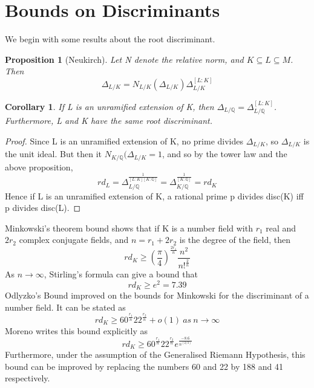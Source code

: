\documentclass[preprint,12pt,reqno]{elsarticle}
\newtheorem{corollary}{Corollary}[theorem]
\newtheorem{proposition}{Proposition}
\begin{document}
\section{Bounds on Discriminants}
We begin with some results about the root discriminant. 
\begin{proposition}[Neukirch]
Let N denote the relative norm, and $K\subseteq L \subseteq M $. Then \begin{equation}
    \Delta_{L/K} = N_{L/K}(\Delta_{L/K})\Delta_{L/K}^{[L:K]}
\end{equation}
\end{proposition}
\begin{corollary}
 If L is an unramified extension of K, then $\Delta_{L/\mathbb{Q}}= \Delta_{L/\mathbb{Q}}^{[L:K]}$. Furthermore, L and K have the same root discriminant.
\end{corollary}
\begin{proof}
Since L is an unramified extension of K, no prime divides $\Delta_{L/K}$, so $\Delta_{L/K}$ is the unit ideal. But then it $N_{K/\mathbb{Q}}(\Delta_{L/K}=1$, and so by the tower law and the above proposition, \begin{equation}
    rd_L=\Delta_{L/\mathbb{Q}}^\frac{1}{[L:K][K:\mathbb{Q}]}=\Delta_{K/\mathbb{Q}}^\frac{1}{[K:\mathbb{Q}]}= rd_K
\end{equation}
Hence if L is an unramified extension of K, a rational prime p divides disc(K) iff p divides disc(L).
\end{proof}
Minkowski's theorem bound shows that if K is a number field with $r_1$ real and $2r_2$ complex conjugate fields, and $n=r_1+2r_2$ is the degree of the field, then 
\begin{equation}
rd_K\geqslant (\frac{\pi}{4})^{\frac{2r_1}{n}}\frac{n^2}{n!^{\frac{2}{n}}}
\end{equation} 
As $n\rightarrow \infty$, Stirling's formula can give a bound that
\begin{equation}
    rd_K\geqslant e^2 = 7.39
\end{equation}
Odlyzko's Bound \cite{ODL2} improved on the bounds for Minkowski for the discriminant of a number field. It can be stated as  
\begin{equation}
rd_K\geqslant 60^{\frac{r_1}{n}}22^{\frac{r_2}{n}}+o(1)\:as\:n\rightarrow \infty   
\end{equation}
Moreno writes this bound explicitly as 
\begin{equation}
rd_K\geqslant 60^{\frac{r_1}{n}}22^{\frac{r_2}{n}}e^\frac{-8.6}{n^(2/3)}
\end{equation}
Furthermore, under the assumption of the Generalised Riemann Hypothesis, 
this bound can be improved by replacing the numbers 60 and 22 by 188 and 41 respectively. 
\end{document}
